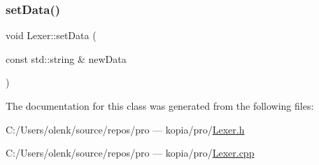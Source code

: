 \subsubsection{\texorpdfstring{setData()}{setData()}}
{\footnotesize\ttfamily void Lexer\+::set\+Data (\begin{DoxyParamCaption}\item[{const std\+::string \&}]{new\+Data }\end{DoxyParamCaption})}



The documentation for this class was generated from the following files\+:\begin{DoxyCompactItemize}
\item 
C\+:/\+Users/olenk/source/repos/pro — kopia/pro/\mbox{\hyperlink{_lexer_8h}{Lexer.\+h}}\item 
C\+:/\+Users/olenk/source/repos/pro — kopia/pro/\mbox{\hyperlink{_lexer_8cpp}{Lexer.\+cpp}}\end{DoxyCompactItemize}
